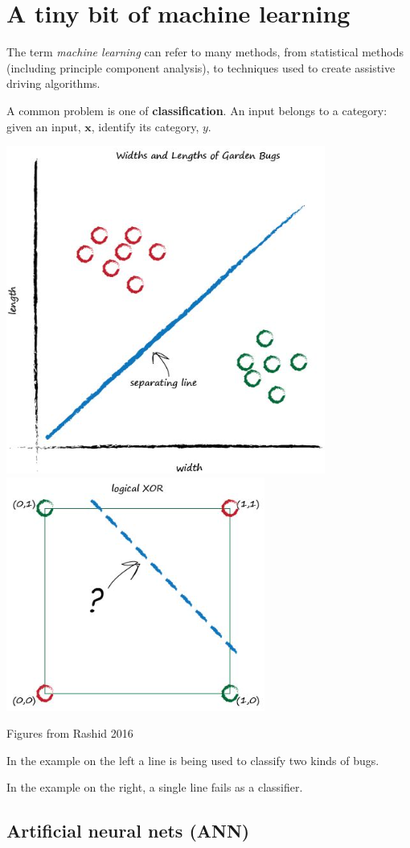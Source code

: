 \documentclass[12pt,letterpaper,noanswers]{exam}
\newcommand{\vc}[1]{\boldsymbol{#1}}
\newcommand{\note}[1]{{#1}} %
\begin{document}
\section*{A tiny bit of machine learning}
\note{The term \emph{machine learning} can refer to many methods, from statistical methods (including principle component analysis), to techniques used to create assistive driving algorithms.

A common problem is one of \textbf{classification}.  An input belongs to a category: given an input, $\vc{x}$, identify its category, $y$.

\includegraphics[scale=0.4]{img/C22rashidbugs.png}
\includegraphics[width=0.4\linewidth]{img/C22rashidxor1.png}

Figures from Rashid 2016 \cite{rashid2016make}

In the example on the left a line is being used to classify two kinds of bugs.

In the example on the right, a single line fails as a classifier.}

\subsection*{Artificial neural nets (ANN)}
\end{document}

